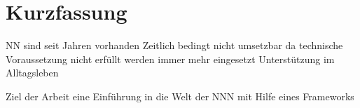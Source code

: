 
\chapter{Kurzfassung}

NN sind seit Jahren vorhanden
Zeitlich bedingt nicht umsetzbar da technische Voraussetzung nicht erfüllt
werden immer mehr eingesetzt 
Unterstützung im Alltagsleben

Ziel der Arbeit eine Einführung in die Welt der NNN mit Hilfe eines Frameworks









